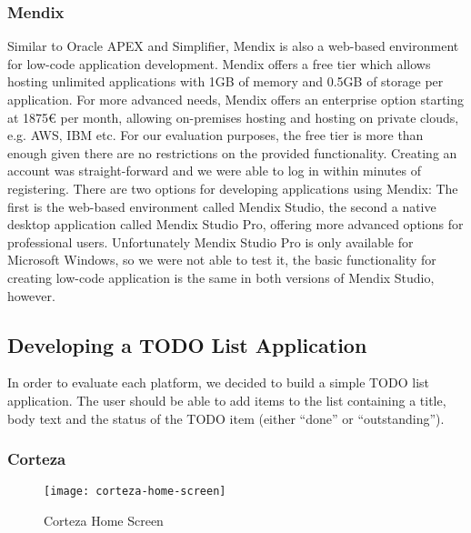 \documentclass[runningheads]{llncs}
\begin{document}
\subsubsection{Mendix}

Similar to Oracle APEX and Simplifier, Mendix is also a web-based environment for low-code application development. Mendix offers a free tier which allows hosting unlimited applications with 1GB of memory and 0.5GB of storage per application. For more advanced needs, Mendix offers an enterprise option starting at 1875€ per month, allowing on-premises hosting and hosting on private clouds, e.g. AWS, IBM etc. For our evaluation purposes, the free tier is more than enough given there are no restrictions on the provided functionality. Creating an account was straight-forward and we were able to log in within minutes of registering. There are two options for developing applications using Mendix: The first is the web-based environment called Mendix Studio, the second a native desktop application called Mendix Studio Pro, offering more advanced options for professional users. Unfortunately Mendix Studio Pro is only available for Microsoft Windows, so we were not able to test it, the basic functionality for creating low-code application is the same in both versions of Mendix Studio, however.

\subsection{Developing a TODO List Application}

In order to evaluate each platform, we decided to build a simple TODO list application. The user should be able to add items to the list containing a title, body text and the status of the TODO item (either “done” or “outstanding”).

\subsubsection{Corteza}

\begin{figure}
  \centering
  \texttt{[image: corteza-home-screen]}
  \caption{Corteza Home Screen}
  \label{fig:corteza_home_screen}
\end{figure}
\end{document}
